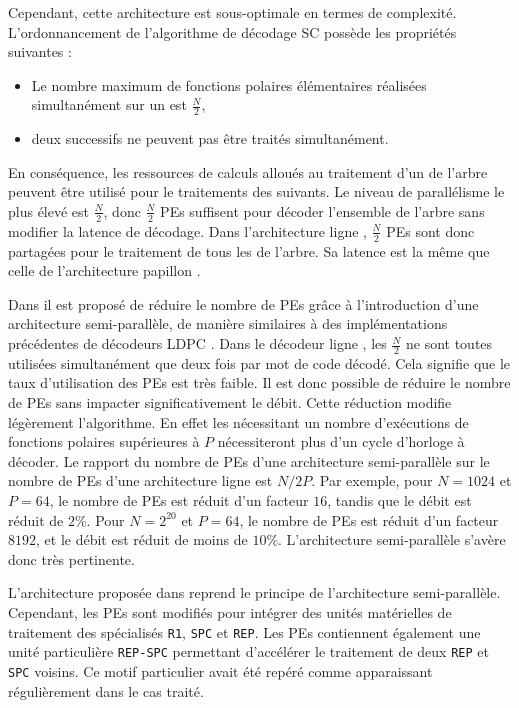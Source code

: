 Cependant, cette architecture est sous-optimale en termes de complexité.
L'ordonnancement de l'algorithme de décodage SC possède les propriétés suivantes :
\begin{itemize}
  \item Le nombre maximum de fonctions polaires élémentaires réalisées simultanément sur un \noeud est $\frac{N}{2}$,
  \item deux \noeuds successifs ne peuvent pas être traités simultanément.
\end{itemize}
En conséquence, les ressources de calculs alloués au traitement d'un \noeud de l'arbre peuvent être utilisé pour le traitements des \noeuds suivants.
Le niveau de parallélisme le plus élevé est $\frac{N}{2}$, donc $\frac{N}{2}$ PEs suffisent pour décoder l'ensemble de l'arbre sans modifier la latence de décodage.
Dans l'architecture \og ligne \fg, $\frac{N}{2}$ PEs sont donc partagées pour le traitement de tous les \noeuds de l'arbre. Sa latence est la même que celle de l'architecture \og papillon \fg.

Dans \cite{leroux_semi-parallel_2013} il est proposé de réduire le nombre de PEs grâce à l'introduction d'une architecture semi-parallèle, de manière similaires à des implémentations précédentes de décodeurs LDPC \cite{1049697}. Dans le décodeur \og ligne \fg, les $\frac{N}{2}$ ne sont toutes utilisées simultanément que deux fois par mot de code décodé. Cela signifie que le taux d'utilisation des PEs est très faible. Il est donc possible de réduire le nombre de PEs sans impacter significativement le débit.
Cette réduction modifie légèrement l'algorithme. En effet les \noeuds nécessitant un nombre d'exécutions de fonctions polaires supérieures à $P$ nécessiteront plus d'un cycle d'horloge à décoder. Le rapport du nombre de PEs d'une architecture semi-parallèle sur le nombre de PEs d'une architecture \og ligne \fg est $N/2P$. Par exemple, pour $N=1024$ et $P=64$, le nombre de PEs est réduit d'un facteur $16$, tandis que le débit est réduit de $2\%$. Pour $N=2^{20}$ et $P=64$, le nombre de PEs est réduit d'un facteur $8192$, et le débit est réduit de moins de $10\%$. L'architecture semi-parallèle s'avère donc très pertinente.

L'architecture proposée dans \cite{sarkis_fast_2014} reprend le principe de l'architecture semi-parallèle. Cependant, les PEs sont modifiés pour intégrer des unités matérielles de traitement des \noeuds spécialisés \texttt{R1}, \texttt{SPC} et \texttt{REP}. Les PEs contiennent également une unité particulière \texttt{REP-SPC} permettant d’accélérer le traitement de deux \noeuds \texttt{REP} et \texttt{SPC} voisins. Ce motif particulier avait été repéré comme apparaissant régulièrement dans le cas traité. 

